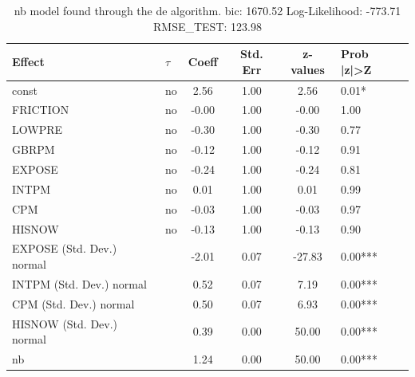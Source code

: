 \begin{table}
	\caption{nb model found through the de algorithm. bic: 1670.52 Log-Likelihood: -773.71 RMSE_TEST: 123.98}
	\begin{center}
		\begin{tabular}{|l|l|c|c|c|l|}
			\hline
			Effect & $\tau$ & Coeff & Std. Err & z-values & Prob |z|>Z \\
			\hline
			const & no & 2.56 & 1.00 & 2.56 & 0.01* \\
			\hline
			FRICTION & no & -0.00 & 1.00 & -0.00 & 1.00 \\
			\hline
			LOWPRE & no & -0.30 & 1.00 & -0.30 & 0.77 \\
			\hline
			GBRPM & no & -0.12 & 1.00 & -0.12 & 0.91 \\
			\hline
			EXPOSE & no & -0.24 & 1.00 & -0.24 & 0.81 \\
			\hline
			INTPM & no & 0.01 & 1.00 & 0.01 & 0.99 \\
			\hline
			CPM & no & -0.03 & 1.00 & -0.03 & 0.97 \\
			\hline
			HISNOW & no & -0.13 & 1.00 & -0.13 & 0.90 \\
			\hline
			EXPOSE (Std. Dev.) normal &  & -2.01 & 0.07 & -27.83 & 0.00*** \\
			\hline
			INTPM (Std. Dev.) normal &  & 0.52 & 0.07 & 7.19 & 0.00*** \\
			\hline
			CPM (Std. Dev.) normal &  & 0.50 & 0.07 & 6.93 & 0.00*** \\
			\hline
			HISNOW (Std. Dev.) normal &  & 0.39 & 0.00 & 50.00 & 0.00*** \\
			\hline
			nb &  & 1.24 & 0.00 & 50.00 & 0.00*** \\
			\hline
		\end{tabular}
	\end{center}
\end{table}
